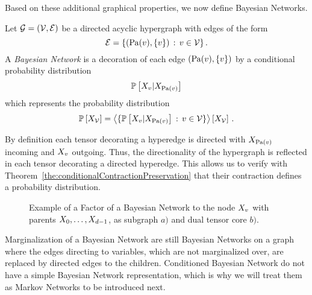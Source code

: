 Based on these additional graphical properties, we now define Bayesian Networks.

\begin{definition}\label{def:bayesianNetwork}
	Let $\mathcal{G}=(\mathcal{V},\mathcal{E})$ be a directed acyclic hypergraph with edges of the form 
		\[ \mathcal{E} = \{(\mathrm{Pa}(v),\{v\}) \, : \, v\in\mathcal{V}\} \, . \]
	A \emph{Bayesian Network} is a decoration of each edge $(\mathrm{Pa}(v),\{v\})$ by a conditional probability distribution
		\[ \mathbb{P}\left[X_{v}|X_{\mathrm{Pa}(v)}\right] \]
	which represents the probability distribution
	\begin{align*}
		\mathbb{P}\left[X_{\mathcal{V}}\right] = \left\langle \{\mathbb{P}\left[X_{v}|X_{\mathrm{Pa}(v)}\right] \, : \, v\in\mathcal{V}\}\right\rangle \left[ X_{\mathcal{V}} \right] \, .
	\end{align*}
\end{definition}

%
By definition each tensor decorating a hyperedge is directed with $X_{\mathrm{Pa}(v)}$ incoming and $X_{v}$ outgoing.
Thus, the directionality of the hypergraph is reflected in each tensor decorating a directed hyperedge.
This allows us to verify with Theorem~\ref{the:conditionalContractionPreservation} that their contraction defines a probability distribution.



\begin{figure}[h]
\begin{center}
	
\end{center}
\caption{Example of a Factor of a Bayesian Network to the node $X_{v}$ with parents $X_{0},\ldots,X_{d-1}$, as subgraph $a)$ and dual tensor core $b)$.}
\label{fig:BayesianFactor}
\end{figure}


Marginalization of a Bayesian Network are still Bayesian Networks on a graph where the edges directing to variables, which are not marginalized over, are replaced by directed edges to the children.
Conditioned Bayesian Network do not have a simple Bayesian Network representation, which is why we will treat them as Markov Networks to be introduced next.


